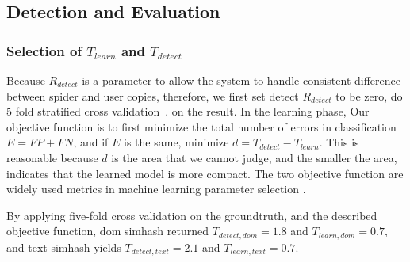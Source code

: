 
%
%
%
%



\subsection{Detection and Evaluation}

\subsubsection{Selection of $T_{learn}$ and $T_{detect}$}
Because $R_{detect}$ is a parameter to allow the system to handle consistent
difference between spider and user copies, therefore, we first set detect
$R_{detect}$ to be zero, do 5 fold stratified cross validation~\cite{scikit-learn}.
on the result. 
In the learning phase,
Our objective function is to first minimize the total number of errors in classification $E = FP + FN$, and
if $E$ is the same, minimize $d = T_{detect} - T_{learn}$.
This is reasonable because $d$ is the area that we cannot judge, and the smaller
the area, indicates that the learned model is more compact. The two objective
function are widely used metrics in machine
learning parameter selection .

By applying five-fold cross validation on the groundtruth, and the described
objective function, dom simhash returned 
$T_{detect, dom} = 1.8$ and $T_{learn, dom} = 0.7$, and text simhash yields
$T_{detect, text} = 2.1$ and $T_{learn, text} = 0.7$.
%
